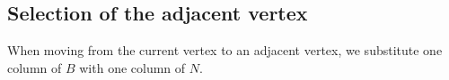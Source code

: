 \documentclass[12pt, a4paper]{report}
\begin{document}
    \subsection{Selection of the adjacent vertex}
    When moving from the current vertex to an adjacent vertex, we substitute one column of $B$ with one column of $N$. 
\end{document}
